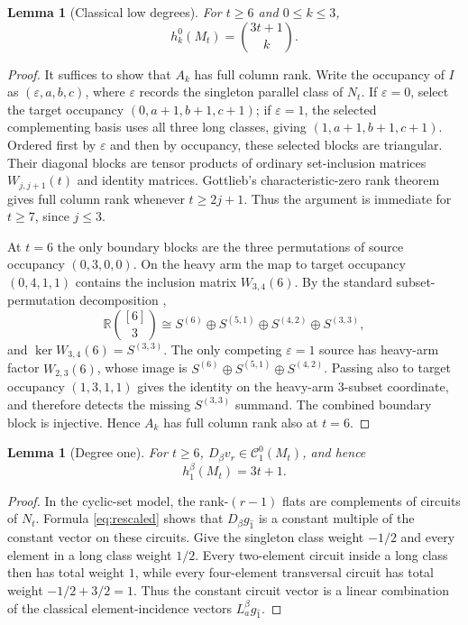 \documentclass[11pt]{amsart}
\newtheorem{lem}[thm]{Lemma}
\theoremstyle{definition}
\theoremstyle{remark}
\newcommand{\cc}{\mathcal}
\begin{document}
\begin{lem}[Classical low degrees]\label{lem:theta-core}
For $t\ge6$ and $0\le k\le3$,
\[
h_k^0(M_t)=\binom{3t+1}{k}.
\]
\end{lem}

\begin{proof}
It suffices to show that $A_k$ has full column rank.  Write the occupancy of $I$ as $(\varepsilon,a,b,c)$, where $\varepsilon$ records the singleton parallel class of $N_t$.  If $\varepsilon=0$, select the target occupancy $(0,a+1,b+1,c+1)$; if $\varepsilon=1$, the selected complementing basis uses all three long classes, giving $(1,a+1,b+1,c+1)$.  Ordered first by $\varepsilon$ and then by occupancy, these selected blocks are triangular.  Their diagonal blocks are tensor products of ordinary set-inclusion matrices $W_{j,j+1}(t)$ and identity matrices.  Gottlieb's characteristic-zero rank theorem \cite{Gottlieb} gives full column rank whenever $t\ge2j+1$.  Thus the argument is immediate for $t\ge7$, since $j\le3$.

At $t=6$ the only boundary blocks are the three permutations of source occupancy $(0,3,0,0)$.  On the heavy arm the map to target occupancy $(0,4,1,1)$ contains the inclusion matrix $W_{3,4}(6)$.  By the standard subset-permutation decomposition \cite{James},
\[
\mathbb R\binom{[6]}3
\cong S^{(6)}\oplus S^{(5,1)}\oplus S^{(4,2)}\oplus S^{(3,3)},
\]
and $\ker W_{3,4}(6)=S^{(3,3)}$.  The only competing $\varepsilon=1$ source has heavy-arm factor $W_{2,3}(6)$, whose image is
$S^{(6)}\oplus S^{(5,1)}\oplus S^{(4,2)}$.  Passing also to target occupancy $(1,3,1,1)$ gives the identity on the heavy-arm $3$-subset coordinate, and therefore detects the missing $S^{(3,3)}$ summand.  The combined boundary block is injective.  Hence $A_k$ has full column rank also at $t=6$.
\end{proof}

\begin{lem}[Degree one]\label{lem:theta-degree1}
For $t\ge6$, $D_\beta v_r\in\cc C_1^0(M_t)$, and hence
\[
h_1^\beta(M_t)=3t+1.
\]
\end{lem}

\begin{proof}
In the cyclic-set model, the rank-$(r-1)$ flats are complements of circuits of $N_t$.  Formula \eqref{eq:rescaled} shows that $D_\beta g_{\hat 1}$ is a constant multiple of the constant vector on these circuits.  Give the singleton class weight $-1/2$ and every element in a long class weight $1/2$.  Every two-element circuit inside a long class then has total weight $1$, while every four-element transversal circuit has total weight $-1/2+3/2=1$.  Thus the constant circuit vector is a linear combination of the classical element-incidence vectors $L_a^\beta g_{\hat 1}$.
\end{proof}
\end{document}
